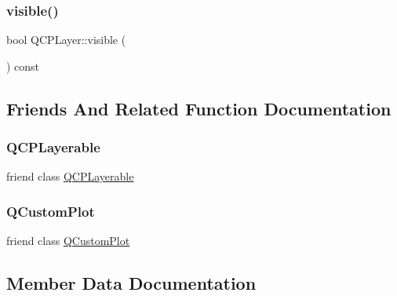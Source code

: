\subsubsection{\texorpdfstring{visible()}{visible()}}
{\footnotesize\ttfamily bool Q\+C\+P\+Layer\+::visible (\begin{DoxyParamCaption}{ }\end{DoxyParamCaption}) const\hspace{0.3cm}{\ttfamily [inline]}}



\subsection{Friends And Related Function Documentation}
\mbox{\label{class_q_c_p_layer_ad655f55cccf49ba14d5172ec517e07ae}} 
\subsubsection{\texorpdfstring{QCPLayerable}{QCPLayerable}}
{\footnotesize\ttfamily friend class \mbox{\hyperlink{class_q_c_p_layerable}{Q\+C\+P\+Layerable}}\hspace{0.3cm}{\ttfamily [friend]}}

\mbox{\label{class_q_c_p_layer_a1cdf9df76adcfae45261690aa0ca2198}} 
\subsubsection{\texorpdfstring{QCustomPlot}{QCustomPlot}}
{\footnotesize\ttfamily friend class \mbox{\hyperlink{class_q_custom_plot}{Q\+Custom\+Plot}}\hspace{0.3cm}{\ttfamily [friend]}}



\subsection{Member Data Documentation}
\mbox{\label{class_q_c_p_layer_a704aa71bba469383c3a3c598c1ec0d28}} 
